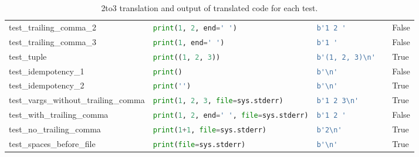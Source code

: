 \begin{table}[h!]
\begin{tabular}{@{}l|lll@{}}
    test\_trailing\_comma\_2              & \lstinline[language=Python, style=pythonstyle]|print(1, 2, end=' ')                 | & \lstinline[language=Python, style=pythonstyle]|b'1 2 '  |                              & False               \\
    test\_trailing\_comma\_3              & \lstinline[language=Python, style=pythonstyle]|print(1, end=' ')                    | & \lstinline[language=Python, style=pythonstyle]|b'1 '        |                          & False               \\
    test\_tuple                           & \lstinline[language=Python, style=pythonstyle]|print((1, 2, 3))                     | & \lstinline[language=Python, style=pythonstyle]|b'(1, 2, 3)\n'  |        & True                \\
    test\_idempotency\_1                  & \lstinline[language=Python, style=pythonstyle]|print()                              | & \lstinline[language=Python, style=pythonstyle]|b'\n'     |              & False               \\
    test\_idempotency\_2                  & \lstinline[language=Python, style=pythonstyle]|print('')                            | & \lstinline[language=Python, style=pythonstyle]|b'\n'        |           & True                \\
    test\_vargs\_without\_trailing\_comma & \lstinline[language=Python, style=pythonstyle]|print(1, 2, 3, file=sys.stderr)      | & \lstinline[language=Python, style=pythonstyle]|b'1 2 3\n'  |            & True                \\
    test\_with\_trailing\_comma           & \lstinline[language=Python, style=pythonstyle]|print(1, 2, end=' ', file=sys.stderr)| & \lstinline[language=Python, style=pythonstyle]|b'1 2 '    |                            & False               \\
    test\_no\_trailing\_comma             & \lstinline[language=Python, style=pythonstyle]|print(1+1, file=sys.stderr)          | & \lstinline[language=Python, style=pythonstyle]|b'2\n'    |             & True                \\
    test\_spaces\_before\_file            & \lstinline[language=Python, style=pythonstyle]|print(file=sys.stderr)               | & \lstinline[language=Python, style=pythonstyle]|b'\n'   |                & True                \\ \bottomrule
    \end{tabular}
    \caption{2to3 translation and output of translated code for each test.}
    \label{table:2to3-accuracy}
\end{table}

